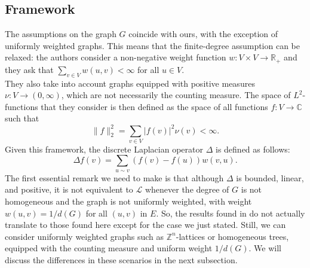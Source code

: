\documentclass[12pt]{amsart}
\theoremstyle{definition}
\numberwithin{equation}{section}
\theoremstyle{definition}
\theoremstyle{remark}
\numberwithin{equation}{section}
\begin{document}
\subsection{Framework}
The assumptions on the graph $G$ coincide with ours, with the exception of uniformly weighted graphs. This means that the finite-degree assumption can be relaxed: the authors consider a non-negative weight function $w: V\times V\longrightarrow \mathbb{R}_+$ and they ask that $\sum_{v \in V}w(u,v) < \infty$ for all $u \in V$.\\
They also take into account graphs equipped with positive measures $\nu: V\longrightarrow (0,\infty)$, which are not necessarily the counting measure. The space of $L^2$-functions that they consider is then defined as the space of all functions $f: V \longrightarrow\mathbb{C}$ such that
$$
\|f\|^2_2 = \sum_{v \in V}|f(v)|^2\nu(v) < \infty.
$$
Given this framework, the discrete Laplacian operator $\Delta$ is defined as follows:
$$
\Delta f(v) = \sum_{u \sim v}(f(v) - f(u))w(v,u).
$$
The first essential remark we need to make is that although $\Delta$ is bounded, linear, and positive, it is not equivalent to $\mathcal{L}$ whenever the degree of $G$ is not homogeneous and the graph is not uniformly weighted, with weight $w(u,v) = 1/d(G)$ for all $(u, v)$ in $E$. So, the results found in \cite{FP} do not actually translate to those found here except for the case we just stated. Still, we can consider uniformly weighted graphs such as $\mathbb{Z}^n$-lattices or homogeneous trees, equipped with the counting measure and uniform weight $1/d(G)$. We will discuss the differences in these scenarios in the next subsection.
\end{document}
